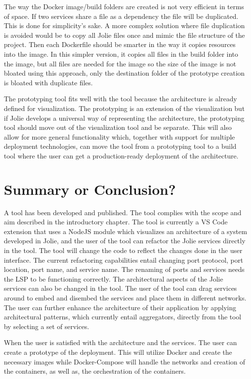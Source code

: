 The way the Docker image/build folders are created is not very efficient in terms of space. If two services share a file as a dependency the file will be duplicated.
This is done for simplicity's sake. A more complex solution where file duplication is avoided would be to copy all Jolie files once and mimic the file structure of the project.
Then each Dockerfile should be smarter in the way it copies resources into the image. In this simpler version, it copies all files in the build folder into the image, but all files are needed for the image so the size of the image is not bloated using this approach, only the destination folder of the prototype creation is bloated with duplicate files.

The prototyping tool fits well with the tool because the architecture is already defined for visualization.
The prototyping is an extension of the visualization but if Jolie develops a universal way of representing the architecture, the prototyping tool should move out of the visualization tool and be separate.
This will also allow for more general functionality which, together with support for multiple deployment technologies, can move the tool from a prototyping tool to a build tool where the user can get a production-ready deployment of the architecture.

\section{Summary or Conclusion?}
A tool has been developed and published. The tool complies with the scope and aim described in the introductory chapter.
The tool is currently a VS Code extension that uses a NodeJS module which visualizes an architecture of a system developed in Jolie, and the user of the tool can refactor the Jolie services directly in the tool. The tool will change the code
to reflect the changes done in the user interface.
The current refactoring capabilities entail changing port protocol, port location, port name, and service name.
The renaming of ports and services needs the LSP to be functioning correctly.
The architectural aspects of the Jolie services can also be changed in the tool. The user of the tool can drag services around to embed and disembed the services and place them in different networks.
The user can further enhance the architecture of their application by applying architectural patterns, which currently entail aggregators, directly from the tool by selecting a set of services.

When the user is satisfied with the architecture and the services. The user can create a prototype of the deployment. This will utilize Docker and create the necessary images while Docker-Compose will handle the networks and creation of the containers, as well as, the orchestration of the containers.

